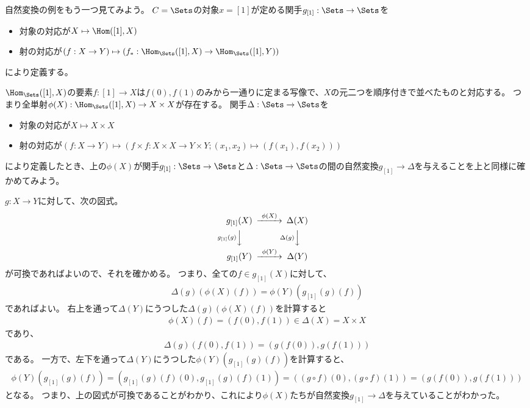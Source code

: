 \documentclass{jsarticle}
\begin{document}
\vspace{10pt}

自然変換の例をもう一つ見てみよう。
$C=\Sets$の対象$x=[1]$が定める関手$g_{[1]}:\Sets \to \Sets$を
\begin{itemize}
\item 対象の対応が$X \mapsto \Hom([1], X)$
\item 射の対応が$(f:X \to Y) \mapsto (f_*:\Hom_{\Sets}([1],X) \to \Hom_{\Sets}([1],Y))$
\end{itemize}
により定義する。

$\Hom_{\Sets}([1],X)$の要素$f:[1] \to X$は$f(0), f(1)$のみから一通りに定まる写像で、$X$の元二つを順序付きで並べたものと対応する。
つまり全単射$\phi(X):\Hom_{\Sets}([1],X) \to X \times X$が存在する。
関手$\Delta:\Sets \to \Sets$を
\begin{itemize}
\item 対象の対応が$X \mapsto X \times X$
\item 射の対応が$(f:X \to Y) \mapsto (f\times f:X \times X \to Y\times Y;(x_1,x_2) \mapsto (f(x_1),f(x_2)))$
\end{itemize}
により定義したとき、上の$\phi(X)$が関手$g_{[1]}:\Sets \to \Sets$と$\Delta:\Sets \to \Sets$の間の自然変換$g_{[1]} \to \Delta$を与えることを上と同様に確かめてみよう。

$g:X \to Y$に対して、次の図式。
\[
\begin{CD}
g_{[1]}(X)@>\phi(X)>>\Delta(X)\\
@Vg_{[1]}(g)VV@V\Delta(g)VV\\
g_{[1]}(Y)@>\phi(Y)>>\Delta(Y)
\end{CD}
\]
が可換であればよいので、それを確かめる。
つまり、全ての$f \in g_{[1]}(X)$に対して、
\begin{align*}
\Delta(g)(\phi(X)(f))=\phi(Y)(g_{[1]}(g)(f))
\end{align*}であればよい。
右上を通って$\Delta(Y)$にうつした$\Delta(g)(\phi(X)(f))$を計算すると
\begin{align*}
\phi(X)(f)=(f(0), f(1))\in\Delta(X)=X\times X
\end{align*}
であり、
\begin{align*}
\Delta(g)(f(0),f(1))=(g(f(0)),g(f(1)))
\end{align*}
である。
一方で、左下を通って$\Delta(Y)$にうつした$\phi(Y)(g_{[1]}(g)(f))$を計算すると、
\begin{align*}
\phi(Y)(g_{[1]}(g)(f))= (g_{[1]}(g)(f)(0),g_{[1]}(g)(f)(1))=((g\circ f)(0), (g\circ f)(1))=(g(f(0)), g(f(1)))
\end{align*}
となる。
つまり、上の図式が可換であることがわかり、これにより$\phi(X)$たちが自然変換$g_{[1]} \to \Delta$を与えていることがわかった。
\end{document}
